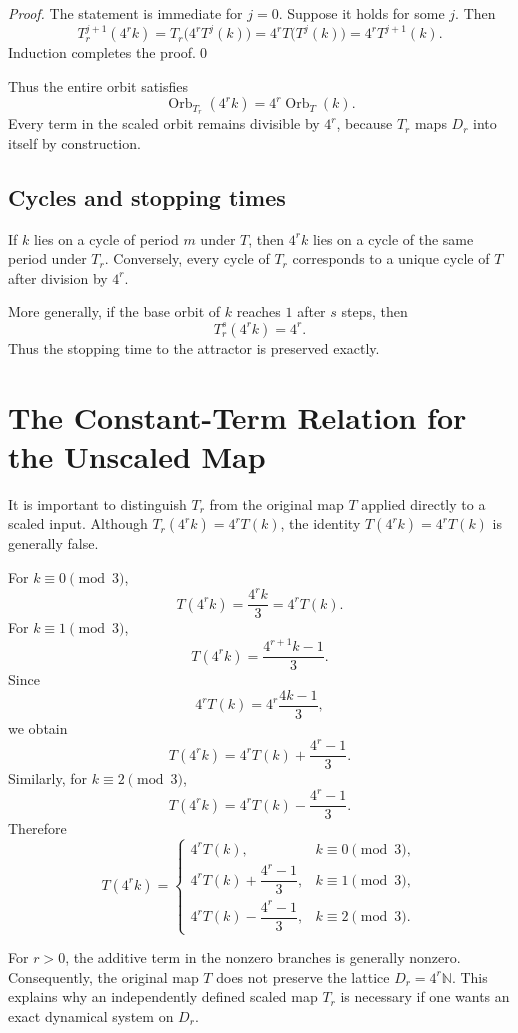 \documentclass[11pt]{article}
\newcommand{\N}{\mathbb{N}}
\begin{document}
\begin{proof}
The statement is immediate for $j=0$. Suppose it holds for some $j$. Then
\[
T_r^{j+1}(4^rk)
=T_r\bigl(4^rT^j(k)\bigr)
=4^rT\bigl(T^j(k)\bigr)
=4^rT^{j+1}(k).
\]
Induction completes the proof.\qed
\end{proof}

Thus the entire orbit satisfies
\begin{equation}
\operatorname{Orb}_{T_r}(4^rk)=4^r\operatorname{Orb}_T(k).
\end{equation}
Every term in the scaled orbit remains divisible by $4^r$, because $T_r$ maps $D_r$ into itself by construction.

\subsection{Cycles and stopping times}
If $k$ lies on a cycle of period $m$ under $T$, then $4^rk$ lies on a cycle of the same period under $T_r$. Conversely, every cycle of $T_r$ corresponds to a unique cycle of $T$ after division by $4^r$.

More generally, if the base orbit of $k$ reaches $1$ after $s$ steps, then
\[
T_r^s(4^rk)=4^r.
\]
Thus the stopping time to the attractor is preserved exactly.

\section{The Constant-Term Relation for the Unscaled Map}
It is important to distinguish $T_r$ from the original map $T$ applied directly to a scaled input. Although $T_r(4^rk)=4^rT(k)$, the identity $T(4^rk)=4^rT(k)$ is generally false.

For $k\equiv0\pmod3$,
\[
T(4^rk)=\frac{4^rk}{3}=4^rT(k).
\]
For $k\equiv1\pmod3$,
\[
T(4^rk)=\frac{4^{r+1}k-1}{3}.
\]
Since
\[
4^rT(k)=4^r\frac{4k-1}{3},
\]
we obtain
\[
T(4^rk)=4^rT(k)+\frac{4^r-1}{3}.
\]
Similarly, for $k\equiv2\pmod3$,
\[
T(4^rk)=4^rT(k)-\frac{4^r-1}{3}.
\]
Therefore
\begin{equation}
T(4^rk)=\begin{cases}
4^rT(k),&k\equiv0\pmod3,\\[4pt]
4^rT(k)+\dfrac{4^r-1}{3},&k\equiv1\pmod3,\\[8pt]
4^rT(k)-\dfrac{4^r-1}{3},&k\equiv2\pmod3.
\end{cases}
\label{eq:constantterm}
\end{equation}

For $r>0$, the additive term in the nonzero branches is generally nonzero. Consequently, the original map $T$ does not preserve the lattice $D_r=4^r\N$. This explains why an independently defined scaled map $T_r$ is necessary if one wants an exact dynamical system on $D_r$.
\end{document}
